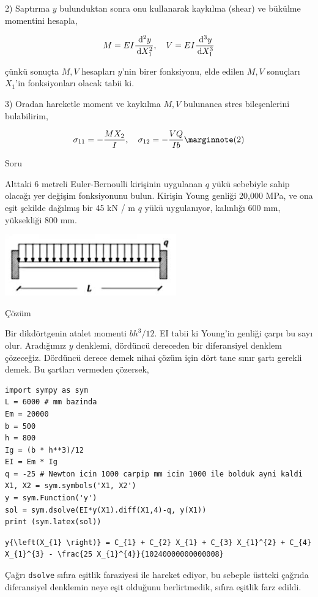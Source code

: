 \documentclass[12pt,fleqn]{article}\usepackage{../../common}
\begin{document}
2) Saptırma $y$ bulunduktan sonra onu kullanarak kaykılma (shear) ve bükülme
momentini hesapla,

$$
M = E I \frac{\,\mathrm{d}^2 y}{\,\mathrm{d} X_1^2}, \quad
V = E I \frac{\,\mathrm{d}^3 y}{\,\mathrm{d} X_1^3} 
$$

çünkü sonuçta $M,V$ hesapları $y$'nin birer fonksiyonu, elde edilen $M,V$
sonuçları $X_1$'in fonksiyonları olacak tabii ki.

3) Oradan hareketle moment ve kaykılma $M,V$ bulunanca stres bileşenlerini
bulabilirim,

$$
\sigma_{11} = -\frac{M X_2}{I}, \quad
\sigma_{12} = -\frac{VQ}{I b}
\mlabel{2}
$$

Soru

Alttaki 6 metreli Euler-Bernoulli kirişinin uygulanan $q$ yükü sebebiyle sahip
olacağı yer değişim fonksiyonunu bulun. Kirişin Young genliği 20,000 MPa, ve ona
eşit şekilde dağılmış bir 45 kN / m $q$ yükü uygulanıyor, kalınlığı 600 mm,
yüksekliği 800 mm.

\includegraphics[width=20em]{phy_020_strs_03_02.jpg}

Çözüm

Bir dikdörtgenin atalet momenti $b h^3 / 12$. EI tabii ki Young'in genliği çarpı
bu sayı olur. Aradığımız $y$ denklemi, dördüncü dereceden bir diferansiyel
denklem çözeceğiz. Dördüncü derece demek nihai çözüm için dört tane sınır
şartı gerekli demek. Bu şartları vermeden çözersek,

\begin{verbatim}
import sympy as sym
L = 6000 # mm bazinda
Em = 20000
b = 500
h = 800
Ig = (b * h**3)/12
EI = Em * Ig
q = -25 # Newton icin 1000 carpip mm icin 1000 ile bolduk ayni kaldi
X1, X2 = sym.symbols('X1, X2')
y = sym.Function('y')
sol = sym.dsolve(EI*y(X1).diff(X1,4)-q, y(X1))
print (sym.latex(sol))
\end{verbatim}

\begin{verbatim}
y{\left(X_{1} \right)} = C_{1} + C_{2} X_{1} + C_{3} X_{1}^{2} + C_{4} X_{1}^{3} - \frac{25 X_{1}^{4}}{10240000000000008}
\end{verbatim}

Çağrı \verb!dsolve! sıfıra eşitlik faraziyesi ile hareket ediyor, bu sebeple
üstteki çağrıda diferansiyel denklemin neye eşit olduğunu berlirtmedik, sıfıra
eşitlik farz edildi.
\end{document}
